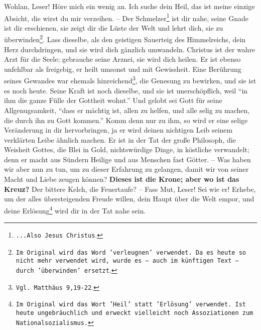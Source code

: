 Wohlan, Leser! Höre mich ein wenig an. Ich suche dein Heil, das ist meine
einzige Absicht, die wirst du mir verzeihen. -- Der
Schmelzer\footnote{\texttt{...Also
Jesus Christus}.} ist dir nahe, seine Gnade ist dir erschienen, sie zeigt dir die
Lüste der Welt und lehrt dich, sie zu überwinden\footnote{\texttt{Im Original
wird das
Word 'verleugnen' verwendet. Da es heute so nicht mehr verwendet wird, wurde
es -- auch im künftigen Text -- durch 'überwinden' ersetzt}.}. Lass dieselbe,
als den geistigen Sauerteig des Himmelreichs, dein Herz durchdringen, und sie
wird dich gänzlich umwandeln. Christus ist der wahre Arzt für die Seele;
gebrauche seine Arznei, sie wird dich heilen. Er ist ebenso unfehlbar als
freigebig, er heilt umsonst und mit Gewissheit. Eine Berührung seines Gewandes
war ehemals hinreichend\footnote{\texttt{Vgl. Matthäus 9,19-22}.}, die Genesung
zu
bewirken, und sie ist es noch heute. Seine Kraft ist noch dieselbe, und sie ist
unerschöpflich, weil "`in ihm die ganze Fülle der Gottheit wohnt."' Und gelobt
sei Gott für seine Allgenugsamkeit, "`dass er mächtig ist, allen zu helfen, und
alle selig zu machen, die durch ihn zu Gott kommen."' Komm denn nur zu ihm, so
wird er eine selige Veränderung in dir hervorbringen, ja er wird deinen
nichtigen Leib seinem verklärten Leibe ähnlich machen. Er ist in der Tat der
große Philosoph, die Weisheit Gottes, die Blei in Gold, nichtswürdige Dinge, in
köstliche verwandelt; denn er macht aus Sündern Heilige und aus Menschen fast
Götter. -- Was haben wir aber nun zu tun, um zu dieser Erfahrung zu gelangen,
damit wir von seiner Macht und Liebe zeugen können? 
 \textbf{Dieses ist die
Krone; aber wo ist das Kreuz?} Der bittere Kelch, die Feuertaufe? -- Fass Mut,
Leser! Sei wie er! Erhebe, um der alles übersteigenden Freude willen, dein Haupt
über die Welt empor, und deine Erlösung\footnote{\texttt{Im Original wird das
Wort
'Heil' statt 'Erlösung' verwendet. Ist heute ungebräuchlich und erweckt
vielleicht noch Assoziationen zum Nationalsozialismus.}} wird dir in der Tat
nahe sein.

\medskip


